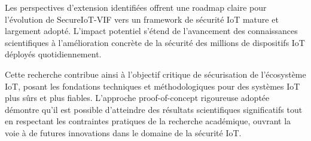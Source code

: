 Les perspectives d'extension identifiées offrent une roadmap claire pour l'évolution de SecureIoT-VIF vers un framework de sécurité IoT mature et largement adopté. L'impact potentiel s'étend de l'avancement des connaissances scientifiques à l'amélioration concrète de la sécurité des millions de dispositifs IoT déployés quotidiennement.

Cette recherche contribue ainsi à l'objectif critique de sécurisation de l'écosystème IoT, posant les fondations techniques et méthodologiques pour des systèmes IoT plus sûrs et plus fiables. L'approche proof-of-concept rigoureuse adoptée démontre qu'il est possible d'atteindre des résultats scientifiques significatifs tout en respectant les contraintes pratiques de la recherche académique, ouvrant la voie à de futures innovations dans le domaine de la sécurité IoT.